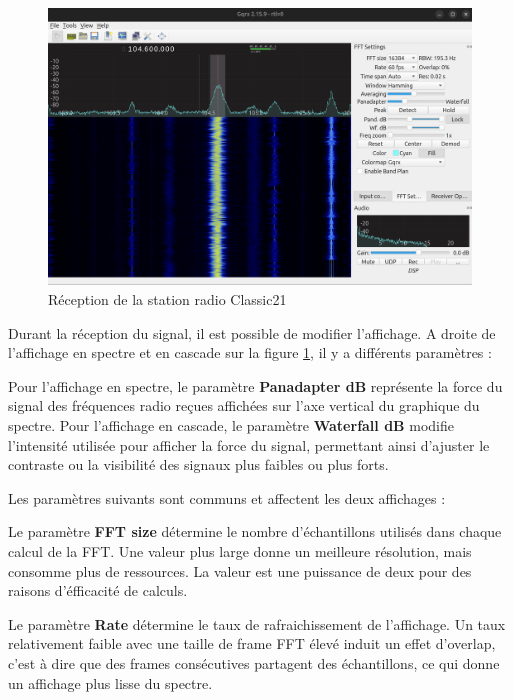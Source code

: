 \newpage

\begin{figure}[h]
\centering

\includegraphics[scale=0.18]{images/gqrx1.png}
\caption{Réception de la station radio Classic21}\label{term38}
\end{figure}

Durant la réception du signal, il est possible de modifier l'affichage. A droite de l'affichage en spectre et en cascade sur la figure \ref{term38}, il y a différents paramètres :

Pour l'affichage en spectre, le paramètre \textbf{Panadapter dB} représente la force du signal des fréquences radio reçues affichées sur l'axe vertical du graphique du spectre. Pour l'affichage en cascade, le paramètre \textbf{Waterfall dB} modifie l'intensité utilisée pour afficher la force du signal, permettant ainsi d'ajuster le contraste ou la visibilité des signaux plus faibles ou plus forts. 

\vspace{0.1cm}

Les paramètres suivants sont communs et affectent les deux affichages :

\vspace{0.1cm}

Le paramètre \textbf{FFT size} détermine le nombre d'échantillons utilisés dans chaque calcul de la FFT. Une valeur plus large donne un meilleure résolution, mais consomme plus de ressources. La valeur est une puissance de deux pour des raisons d'éfficacité de calculs.

\vspace{0.1cm}

Le paramètre \textbf{Rate} détermine le taux de rafraichissement de l'affichage. Un taux relativement faible avec une taille de frame FFT élevé induit un effet d'overlap, c'est à dire que des frames consécutives partagent des échantillons, ce qui donne un affichage plus lisse du spectre.


